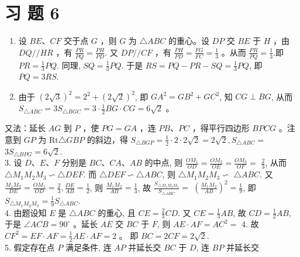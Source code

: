 \documentclass[10pt]{article}
\begin{document}
\section*{习 题 6}
\begin{enumerate}
  \item 设 $B E 、 C F$ 交于点 $G$ ，则 $G$ 为 $\triangle A B C$ 的重心。设 $D P$ 交 $B E$ 于 $H$ ，由 $D Q / / H R$ ，有 $\frac{P R}{P Q}=\frac{P H}{P D}$. 又 $D P / / C F$ ，有 $\frac{P H}{P D}=\frac{F G}{F C}=\frac{1}{3}$ 。从而 $\frac{P R}{P Q}=\frac{1}{3}$.即 $P R=\frac{1}{3} P Q$. 同理, $S Q=\frac{1}{3} P Q$. 于是 $R S=P Q-P R-S Q=\frac{1}{3} P Q$, 即 $P Q=3 R S$.
  \item 由于 $(2 \sqrt{3})^{2}=2^{2}+(2 \sqrt{2})^{2}$, 即 $G A^{2}=G B^{2}+G C^{2}$, 知 $C G \perp B G$, 从而 $S_{\triangle A B C}=3 S_{\triangle B G C}=3 \cdot \frac{1}{2} B G \cdot C G=6 \sqrt{2}$ 。
\end{enumerate}

又法：延长 $A G$ 到 $P$ ，使 $P G=G A$ ，连 $P B 、 P C$ ，得平行四边形 $B P C G$ 。注意到 $G P$ 为 $\mathrm{Rt} \triangle G B P$ 的斜边，得 $S_{\triangle B G P}=\frac{1}{2} \cdot 2 \cdot 2 \sqrt{2}=2 \sqrt{2}, S_{\triangle A B C}=$ $3 S_{\triangle B P G}=6 \sqrt{2}$.\\
3. 设 $D 、 E 、 F$ 分别是 $B C 、 C A 、 A B$ 的中点, 则 $\frac{O M_{1}}{O D}=\frac{O M_{2}}{O E}=\frac{O M_{3}}{O F}=$ $\frac{2}{3}$, 从而 $\triangle M_{1} M_{2} M_{3} \backsim \triangle D E F$. 而 $\triangle D E F \backsim \triangle A B C$, 则 $\triangle M_{1} M_{2} M_{3} \backsim$ $\triangle A B C$. 又 $\frac{M_{1} M_{2}}{D E}=\frac{O M_{1}}{O D}=\frac{2}{3}, \frac{D E}{A B}=\frac{1}{2}$, 则 $\frac{M_{1} M_{2}}{A B}=\frac{1}{3}$, 故 $\frac{S_{\triangle M_{1} M_{2} M_{3}}}{S_{\triangle A B C}}=$ $\left(\frac{M_{1} M_{2}}{A B}\right)^{2}=\frac{1}{9}$, 即 $S_{\triangle M_{1} M_{2} M_{3}}=\frac{1}{9} S_{\triangle A B C}$.\\
4. 由题设知 $E$ 是 $\triangle A B C$ 的重心, 且 $C E=\frac{2}{3} C D$. 又 $C E=\frac{1}{3} A B$, 故 $C D=\frac{1}{2} A B$, 于是 $\angle A C B=90^{\circ}$ 。延长 $A E$ 交 $B C$ 于 $F$, 则 $A E \cdot A F=A C^{2}=$ 4. 故 $C F^{2}=E F \cdot A F=\frac{1}{2} A E \cdot A F=2$ 。 即 $B C=2 C F=2 \sqrt{2}$.\\
5. 假定存在点 $P$ 满足条件, 连 $A P$ 并延长交 $B C$ 于 $D$, 连 $B P$ 并延长交
\end{document}
